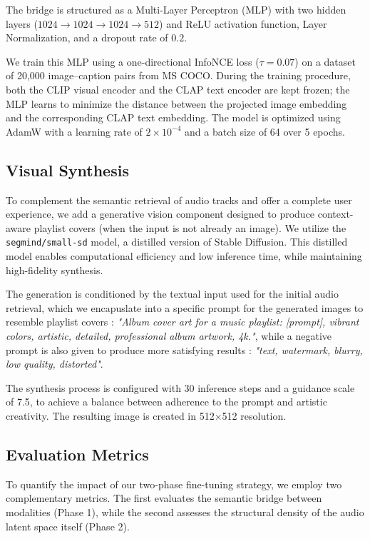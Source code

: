 \documentclass[11pt]{article}
\begin{document}
The bridge is structured as a Multi-Layer Perceptron (MLP) with two hidden layers ($1024 \to 1024 \to 1024 \to 512$) and ReLU activation function, Layer Normalization, and a dropout rate of $0.2$.

We train this MLP using a one-directional InfoNCE loss ($\tau=0.07$) on a dataset of 20,000 image--caption pairs from MS COCO. During the training procedure, both the CLIP visual encoder and the CLAP text encoder are kept frozen; the MLP learns to minimize the distance between the projected image embedding and the corresponding CLAP text embedding. The model is optimized using AdamW with a learning rate of $2 \times 10^{-4}$ and a batch size of 64 over 5 epochs.


\subsection{Visual Synthesis}
\label{sec:visual_gen}

To complement the semantic retrieval of audio tracks and offer a complete user experience, we add a generative vision component designed to produce context-aware playlist covers (when the input is not already an image).  We utilize the \texttt{segmind/small-sd} model, a distilled version of Stable Diffusion. This distilled model enables computational efficiency and low inference time, while maintaining high-fidelity synthesis.

The generation is conditioned by the textual input used for the initial audio retrieval, which we encapuslate into a specific prompt for the generated images to resemble playlist covers :
\textit{"Album cover art for a music playlist: [prompt], vibrant colors, artistic, detailed, professional album artwork, 4k."}, while a negative prompt is also given to produce more satisfying results : \textit{"text, watermark, blurry, low quality, distorted"}.

The synthesis process is configured with 30 inference steps and a guidance scale of 7.5, to achieve a balance between adherence to the prompt and artistic creativity. The resulting image is created in 512$\times$512 resolution.


\subsection{Evaluation Metrics}

To quantify the impact of our two-phase fine-tuning strategy, we employ two complementary metrics. The first evaluates the semantic bridge between modalities (Phase 1), while the second assesses the structural density of the audio latent space itself (Phase 2).
\end{document}
